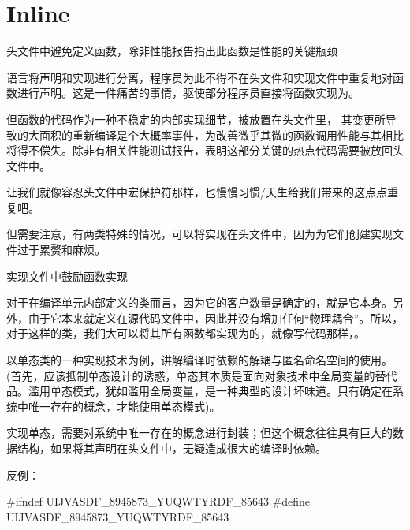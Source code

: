 \section{Inline}

\begin{content}

\begin{regulation}
头文件中避免定义函数，除非性能报告指出此函数是性能的关键瓶颈
\end{regulation}

\cpp{}语言将声明和实现进行分离，程序员为此不得不在头文件和实现文件中重复地对函数进行声明。这是一件痛苦的事情，驱使部分程序员直接将函数实现为。

但函数的代码作为一种不稳定的内部实现细节，被放置在头文件里，
其变更所导致的大面积的重新编译是个大概率事件，为改善微乎其微的函数调用性能与其相比将得不偿失。除非有相关性能测试报告，表明这部分关键的热点代码需要被放回头文件中。

让我们就像容忍头文件中宏保护符那样，也慢慢习惯\clang{}/\cpp{}天生给我们带来的这点点重复吧。

但需要注意，有两类特殊的情况，可以将实现在头文件中，因为为它们创建实现文件过于累赘和麻烦。

\begin{enum}
\end{enum}

\begin{regulation}
实现文件中鼓励函数实现
\end{regulation}

对于在编译单元内部定义的类而言，因为它的客户数量是确定的，就是它本身。另外，由于它本来就定义在源代码文件中，因此并没有增加任何“物理耦合”。所以，对于这样的类，我们大可以将其所有函数都实现为的，就像写代码那样，。

以单态类的一种实现技术为例，讲解编译时依赖的解耦与匿名命名空间的使用。(首先，应该抵制单态设计的诱惑，单态其本质是面向对象技术中全局变量的替代品。滥用单态模式，犹如滥用全局变量，是一种典型的设计坏味道。只有确定在系统中唯一存在的概念，才能使用单态模式)。

实现单态，需要对系统中唯一存在的概念进行封装；但这个概念往往具有巨大的数据结构，如果将其声明在头文件中，无疑造成很大的编译时依赖。

反例：
\begin{leftbar}
\begin{c++}[caption={ne/NetworkElementRepository.h}]
#ifndef UIJVASDF_8945873_YUQWTYRDF_85643
#define UIJVASDF_8945873_YUQWTYRDF_85643    


\end{c++}
\end{leftbar}
\end{content}
